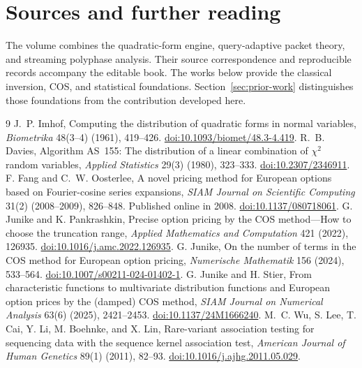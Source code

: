 \backmatter
\chapter{Sources and further reading}
The volume combines the quadratic-form engine, query-adaptive packet theory, and streaming polyphase analysis. Their source correspondence and reproducible records accompany the editable book. The works below provide the classical inversion, COS, and statistical foundations. Section~\ref{sec:prior-work} distinguishes those foundations from the contribution developed here.

\begingroup\small
\patchcmd{\thebibliography}{\chapter*{\bibname}}{\section*{\bibname}}{}{}
\begin{thebibliography}{9}
 J.~P. Imhof, Computing the distribution of quadratic forms
in normal variables, \emph{Biometrika} 48(3--4) (1961), 419--426.
\href{https://doi.org/10.1093/biomet/48.3-4.419}{doi:10.1093/biomet/48.3-4.419}.
 R.~B. Davies, Algorithm AS~155: The distribution of a
linear combination of $\chi^2$ random variables,
\emph{Applied Statistics} 29(3) (1980), 323--333.
\href{https://doi.org/10.2307/2346911}{doi:10.2307/2346911}.
 F. Fang and C.~W. Oosterlee, A novel pricing
method for European options based on Fourier-cosine series expansions,
\emph{SIAM Journal on Scientific Computing} 31(2) (2008--2009), 826--848.
Published online in 2008.
\href{https://doi.org/10.1137/080718061}{doi:10.1137/080718061}.
 G. Junike and K. Pankrashkin,
Precise option pricing by the COS method---How to choose the truncation range,
\emph{Applied Mathematics and Computation} 421 (2022), 126935.
\href{https://doi.org/10.1016/j.amc.2022.126935}{doi:10.1016/j.amc.2022.126935}.
 G. Junike, On the number of terms in the COS method
for European option pricing, \emph{Numerische Mathematik} 156 (2024), 533--564.
\href{https://doi.org/10.1007/s00211-024-01402-1}{doi:10.1007/s00211-024-01402-1}.
 G. Junike and H. Stier, From characteristic
functions to multivariate distribution functions and European option prices
by the (damped) COS method, \emph{SIAM Journal on Numerical Analysis}
63(6) (2025), 2421--2453.
\href{https://doi.org/10.1137/24M1666240}{doi:10.1137/24M1666240}.
 M.~C. Wu, S. Lee, T. Cai, Y. Li, M. Boehnke, and X. Lin,
Rare-variant association testing for sequencing data with the sequence
kernel association test, \emph{American Journal of Human Genetics}
89(1) (2011), 82--93.
\href{https://doi.org/10.1016/j.ajhg.2011.05.029}{doi:10.1016/j.ajhg.2011.05.029}.
\end{thebibliography}
\endgroup
